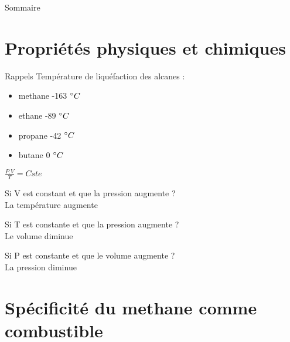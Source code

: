 \documentclass[xcolor=dvipsnames,hyperref={breaklinks=true},mathserif,
professionalfont,12pt]{beamer}
\author{Cyrille Reggio}
\begin{document}
    
    \begin{frame}{Sommaire}
        \tableofcontents
    \end{frame}

 \section{Propriétés physiques et chimiques}
\begin{frame}{Rappels}
Température de liquéfaction des alcanes :
 \begin{itemize}
  \item methane -163 $\degree C$
  \item ethane -89 $\degree C$
  \item propane -42 $\degree C$
  \item butane 0 $\degree C$
\end{itemize}

\end{frame}

\begin{frame}
\centering

\large
 $\frac{P.V}{T}=Cste$
\end{frame}

\begin{frame}
 Si V est constant et que la pression augmente ?\\
 \pause La température augmente
\end{frame}

\begin{frame}
 Si T est constante et que la pression augmente ?\\
 \pause Le volume diminue
\end{frame}

\begin{frame}
\end{frame}

\begin{frame}
 Si P est constante et que le volume augmente ?\\
 \pause La pression diminue
\end{frame}

\section{Spécificité du methane comme combustible}

\begin{frame}
 
\end{frame}
\end{document}
